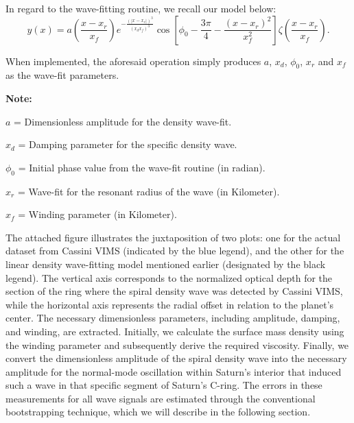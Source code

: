 \documentclass{article}
\begin{document}
In regard to the wave-fitting routine, we recall our model below:
\begin{equation}
    y(x) = a\left(\frac{x-x_{r}}{x_{f}}\right)e^{-\frac{(|x-x_{r}|)^{3}}{(x_{d}x_{f})^{3}}}\cos\left[\phi_{0} - \frac{3\pi}{4} - \frac{{(x-x_{r})^2}}{{x_{f}^{2}}}\right]\zeta\left(\frac{x-x_{r}}{x_{f}}\right).
\end{equation}

When implemented, the aforesaid operation simply produces $a$, $x_{d}$, $\phi_{0}$, $x_{r}$ and $x_{f}$ as the wave-fit parameters.

\vspace{3pt}

\textbf{Note:}

\vspace{3pt}
\textbf{$a$} = Dimensionless amplitude for the density wave-fit.

\vspace{3pt}
\textbf{$x_{d}$} = Damping parameter for the specific density wave.

\vspace{3pt}
\textbf{$\phi_{0}$} = Initial phase value from the wave-fit routine (in radian).

\vspace{3pt}
\textbf{$x_{r}$} = Wave-fit for the resonant radius of the wave (in Kilometer).

\vspace{3pt}
\textbf{$x_{f}$} = Winding parameter (in Kilometer).

\vspace{10pt}
The attached figure illustrates the juxtaposition of two plots: one for the actual dataset from Cassini VIMS (indicated by the blue legend), and the other for the linear density wave-fitting model mentioned earlier (designated by the black legend). The vertical axis corresponds to the normalized optical depth for the section of the ring where the spiral density wave was detected by Cassini VIMS, while the horizontal axis represents the radial offset in relation to the planet's center.
The necessary dimensionless parameters, including amplitude, damping, and winding, are extracted. Initially, we calculate the surface mass density using the winding parameter and subsequently derive the required viscosity. Finally, we convert the dimensionless amplitude of the spiral density wave into the necessary amplitude for the normal-mode oscillation within Saturn's interior that induced such a wave in that specific segment of Saturn's C-ring.
The errors in these measurements for all wave signals are estimated through the conventional bootstrapping technique, which we will describe in the following section.
\end{document}
